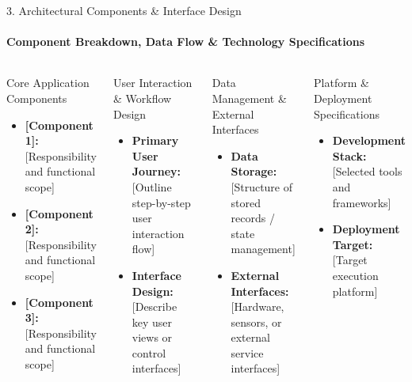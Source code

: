 \documentclass[aspectratio=169, 11pt]{beamer}
\begin{document}
\begin{frame}{3. Architectural Components \& Interface Design}
    \framesubtitle{Component Breakdown, Data Flow \& Technology Specifications}
    \begin{columns}[T]
        \begin{block}{Core Application Components}
            \footnotesize
            \begin{itemize}
                \item \textbf{[Component 1]:} {[Responsibility and functional scope]}
                \item \textbf{[Component 2]:} {[Responsibility and functional scope]}
                \item \textbf{[Component 3]:} {[Responsibility and functional scope]}
            \end{itemize}
        \end{block}

        \begin{block}{User Interaction \& Workflow Design}
            \footnotesize
            \begin{itemize}
                \item \textbf{Primary User Journey:} {[Outline step-by-step user interaction flow]}
                \item \textbf{Interface Design:} {[Describe key user views or control interfaces]}
            \end{itemize}
        \end{block}

        \begin{block}{Data Management \& External Interfaces}
            \footnotesize
            \begin{itemize}
                \item \textbf{Data Storage:} {[Structure of stored records / state management]}
                \item \textbf{External Interfaces:} {[Hardware, sensors, or external service interfaces]}
            \end{itemize}
        \end{block}

        \begin{block}{Platform \& Deployment Specifications}
            \footnotesize
            \begin{itemize}
                \item \textbf{Development Stack:} {[Selected tools and frameworks]}
                \item \textbf{Deployment Target:} {[Target execution platform]}
            \end{itemize}
        \end{block}
    \end{columns}
\end{frame}
\end{document}
